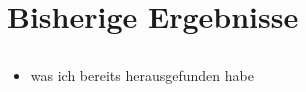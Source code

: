 \documentclass[compress]{beamer}
\begin{document}
\section{Bisherige Ergebnisse}
\subsection{}
\begin{frame}
	\begin{itemize}
		\item was ich bereits herausgefunden habe
	\end{itemize}
\end{frame}
\end{document}
